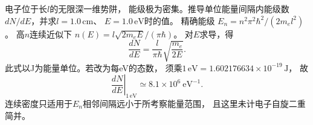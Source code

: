电子位于长$l$的无限深一维势阱，
能级极为密集。推导单位能量间隔内能级数
$dN/dE$，并求$l=1.0\,\mathrm{cm}$、
$E=1.0\,\mathrm{eV}$时的值。
\exsolution
精确能级
$E_n=n^2\pi^2\hbar^2/(2m_el^2)$。
高$n$连续近似下
$n(E)=l\sqrt{2m_eE}/(\pi\hbar)$。
对$E$求导，得
\[
 \boxed{\frac{dN}{dE}=\frac l{\pi\hbar}
 \sqrt{\frac{m_e}{2E}}}.
\]
此式以J为能量单位。若改为每eV的态数，
须乘$1\,\mathrm{eV}=1.602176634\times10^{-19}\,\mathrm J$，
故
\[
 \boxed{\left.\frac{dN}{dE}\right|_{1\,\mathrm{eV}}
 \simeq8.1\times10^6\ \mathrm{eV^{-1}}}.
\]
\excheck 连续密度只适用于$E_n$相邻间隔远小于所考察能量范围，
且这里未计电子自旋二重简并。
